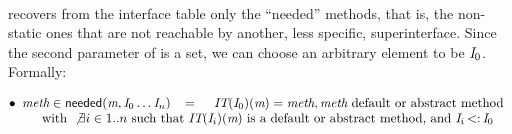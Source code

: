 \paragraph{\tops{}} recovers from the interface table only the ``needed'' methods, that is,
the non-static ones that are not reachable by another, less specific, superinterface.
Since the second parameter of \tops{} is a set, we can choose an arbitrary element to be $\textit{I}_0$.
Formally:

\noindent$\begin{array}{l}
\InTextDef{27ex}{
\method\in\tops(\m,\C_0\dots\C_n)}{
 }{
\metaVar{IT}(\C_0)(\m)=\method,  \method\mbox{ default or abstract method}
 }\\
\InTextWith{
\not\exists i\in1..n \mbox{ such that } 
\metaVar{IT}(\C_i)(\m)\mbox{ is a default or abstract method, and }
\C_i \subtype \C_0}

\end{array}$


